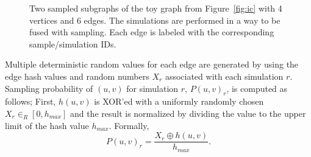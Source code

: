 \documentclass[10pt,journal,compsoc]{IEEEtran}
\begin{document}
\begin{figure}[!ht] 
    \centering
  \caption{
  \protect{} Two sampled subgraphs of the toy graph from Figure~\ref{fig:ic} with 4 vertices and 6 edges.
  \protect{} The simulations are performed in a way to be fused with sampling. Each edge is labeled with the corresponding sample/simulation IDs. 
  }
  \label{fig:traversal} 
\end{figure}


Multiple deterministic random values for each edge are generated by using the edge hash values and random numbers $X_r$ associated with each simulation $r$. 
Sampling probability of $(u, v)$ for simulation $r$, $P(u, v)_r$, is computed as follows; First, $h(u,v)$ is XOR'ed with a uniformly randomly chosen $X_r \in_R [0, h_{max}]$ and the result is normalized by dividing the value to the upper limit of the hash value $h_{max}$. Formally,
\begin{equation}
    \label{eq:hash_prob}
    P(u,v)_r = \frac{X_r \oplus h(u,v)}{h_{max}}.
\end{equation}
\end{document}
